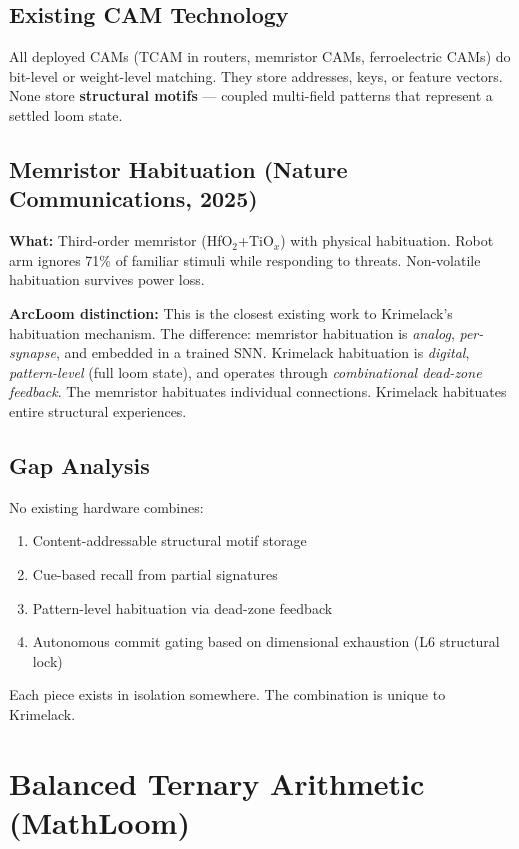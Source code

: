 \documentclass[11pt, a4paper]{article}
\begin{document}
\subsection{Existing CAM Technology}

All deployed CAMs (TCAM in routers, memristor CAMs, ferroelectric CAMs)
do bit-level or weight-level matching. They store addresses, keys, or
feature vectors. None store \textbf{structural motifs} --- coupled
multi-field patterns that represent a settled loom state.

\subsection{Memristor Habituation (Nature Communications, 2025)}

\textbf{What:} Third-order memristor (HfO$_2$+TiO$_x$) with physical
habituation. Robot arm ignores 71\% of familiar stimuli while responding
to threats. Non-volatile habituation survives power loss.

\textbf{ArcLoom distinction:} This is the closest existing work to
Krimelack's habituation mechanism. The difference: memristor habituation
is \textit{analog}, \textit{per-synapse}, and embedded in a trained SNN.
Krimelack habituation is \textit{digital}, \textit{pattern-level}
(full loom state), and operates through \textit{combinational dead-zone
feedback}. The memristor habituates individual connections. Krimelack
habituates entire structural experiences.

\subsection{Gap Analysis}

No existing hardware combines:
\begin{enumerate}[nosep]
  \item Content-addressable structural motif storage
  \item Cue-based recall from partial signatures
  \item Pattern-level habituation via dead-zone feedback
  \item Autonomous commit gating based on dimensional exhaustion
        (L6 structural lock)
\end{enumerate}

Each piece exists in isolation somewhere. The combination is unique
to Krimelack.

\section{Balanced Ternary Arithmetic (MathLoom)}
\end{document}
